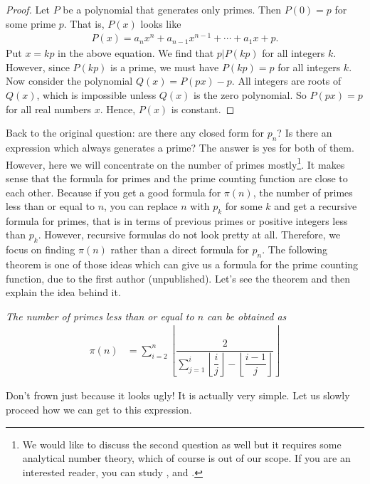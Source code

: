 \documentclass{subfiles}
\begin{document}
			\begin{proof}
				Let $P$ be a polynomial that generates only primes. Then $P(0)=p$ for some prime $p$. That is, $P(x)$ looks like
					\begin{align*}
					P(x)=a_nx^n+a_{n-1}x^{n-1} + \cdots + a_1x + p.
					\end{align*}
				Put $x=kp$ in the above equation. We find that $p|P(kp)$ for all integers $k$. However, since $P(kp)$ is a prime, we must have $P(kp)=p$ for all integers $k$. Now consider the polynomial $Q(x)=P(px)-p$. All integers are roots of $Q(x)$, which is impossible unless $Q(x)$ is the zero polynomial. So $P(px)=p$ for all real numbers $x$. Hence, $P(x)$ is constant.
			\end{proof}
		Back to the original question: are there any closed form for $p_n$? Is there an expression which always generates a prime? The answer is yes for both of them. However, here we will concentrate on the number of primes mostly\footnote{We would like to discuss the second question as well but it requires some analytical number theory, which of course is out of our scope. If you are an interested reader, you can study \textcite{ingham_1937}, \textcite{mills_1947} and \textcite{niven_1951}.}. It makes sense that the formula for primes and the prime counting function are close to each other. Because if you get a good formula for $\pi(n)$, the number of primes less than or equal to $n$, you can replace $n$ with $p_k$ for some $k$ and get a recursive formula for primes, that is in terms of previous primes or positive integers less than $p_k$. However, recursive formulas do not look pretty at all. Therefore, we focus on finding $\pi(n)$ rather than a direct formula for $p_n$. The following theorem is one of those ideas which can give us a formula for the prime counting function, due to the first author (unpublished). Let's see the theorem and then explain the idea behind it.
			\begin{theorem}\slshape
				The number of primes less than or equal to $n$ can be obtained as
					\begin{align*}
						\pi(n) & =
							\sum_{i=2}^{n}\left\lfloor\dfrac{2}{\sum_{j=1}^{i}\left\lfloor\dfrac{i}{j}\right\rfloor-\left\lfloor\dfrac{i-1}{j}\right\rfloor}\right\rfloor
					\end{align*}
			\end{theorem}
		Don't frown just because it looks ugly! It is actually very simple. Let us slowly proceed how we can get to this expression.
\end{document}
